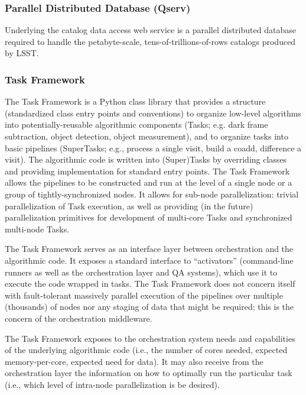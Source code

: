 \documentclass[DM,lsstdraft,toc]{lsstdoc}
\begin{document}
\subsubsection{Parallel Distributed Database
(Qserv)}\label{parallel-distributed-database-qserv}

Underlying the catalog data access web service is a parallel distributed
database required to handle the petabyte-scale,
tens-of-trillions-of-rows catalogs produced by LSST.

\subsubsection{Task Framework}\label{task-framework}

The Task Framework is a Python class library that provides a structure
(standardized class entry points and conventions) to organize low-level
algorithms into potentially-reusable algorithmic components (Tasks; e.g.
dark frame subtraction, object detection, object measurement), and to
organize tasks into basic pipelines (SuperTasks; e.g., process a single
visit, build a coadd, difference a visit). The algorithmic code is
written into (Super)Tasks by overriding classes and providing
implementation for standard entry points. The Task Framework allows the
pipelines to be constructed and run at the level of a single node or a
group of tightly-synchronized nodes. It allows for sub-node
parallelization: trivial parallelization of Task execution, as well as
providing (in the future) parallelization primitives for development of
multi-core Tasks and synchronized multi-node Tasks.

The Task Framework serves as an interface layer between orchestration
and the algorithmic code. It exposes a standard interface to
``activators'' (command-line runners as well as the orchestration layer
and QA systems), which use it to execute the code wrapped in tasks. The
Task Framework does not concern itself with fault-tolerant massively
parallel execution of the pipelines over multiple (thousands) of nodes
nor any staging of data that might be required; this is the concern of
the orchestration middleware.

The Task Framework exposes to the orchestration system needs and
capabilities of the underlying algorithmic code (i.e., the number of
cores needed, expected memory-per-core, expected need for data). It may
also receive from the orchestration layer the information on how to
optimally run the particular task (i.e., which level of intra-node
parallelization is be desired).
\end{document}

